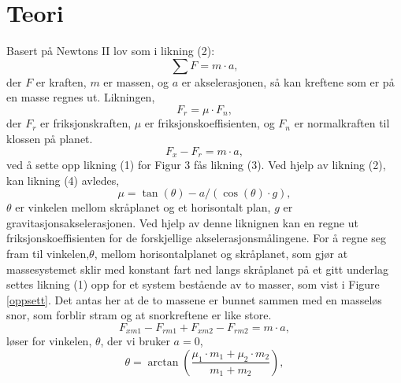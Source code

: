 \documentclass[10pt,a4paper]{report}
\begin{document}
{\let\clearpage\relax\chapter*{Teori}}
Basert på Newtons II lov som i likning (2): 
\begin{equation}
\sum{F} = m \cdot a,
\end{equation} der $F$ er kraften, $m$ er massen, og $a$ er akselerasjonen, så kan kreftene som er på en masse regnes ut. Likningen,
\begin{equation}
F_r = \mu \cdot F_n,
\end{equation}
der $F_r$ er friksjonskraften, $\mu$ er friksjonskoeffisienten, og $F_n$ er normalkraften til klossen på planet. 
\begin{equation}
F_x - F_r = m \cdot a,
\end{equation}
ved å sette opp likning (1) for Figur 3 fås likning (3). Ved hjelp av likning (2), kan likning (4) avledes,
\begin{equation}
\mu = \tan(\theta)-a/(\cos(\theta)\cdot g),
\end{equation}
$\theta$ er vinkelen mellom skråplanet og et horisontalt plan, $g$ er gravitasjonsakselerasjonen. Ved hjelp av denne liknignen kan en regne ut friksjonskoeffisienten for de forskjellige akselerasjonsmålingene. For å regne seg fram til vinkelen,$\theta$, mellom horisontalplanet og skråplanet, som gjør at massesystemet sklir med konstant fart ned langs skråplanet på et gitt underlag settes likning (1) opp for et system bestående av to masser, som vist i Figure \ref{oppsett}. Det antas her at de to massene er bunnet sammen med en masseløs snor, som forblir stram og at snorkreftene er like store.
\begin{equation}
F_{xm1} - F_{rm1} + F_{xm2} - F_{rm2} = m \cdot a,
\end{equation}
løser for vinkelen, $\theta$, der vi bruker $a = 0$, 
\begin{equation}
\theta = \arctan(\frac{\mu_1 \cdot m_1+\mu_2 \cdot m_2}{m_1+m_2}),
\end{equation}
\end{document}
